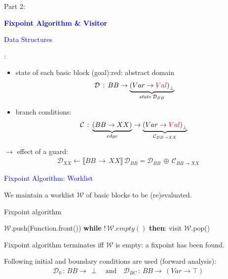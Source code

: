 \begin{frame}

Part 2:
\vspace{0.2cm}

{\LARGE \textbf{\textcolor{blue}{Fixpoint Algorithm \& Visitor}}}

\end{frame}


\begin{frame}[fragile]{\textcolor{blue}{Data Structures}}

\underline{}:
\begin{itemize}
\item {\color{blue}state} of each basic block (goal):\hfill {\color{red}red: abstract domain}
\begin{align*}
\mathcal{D}\,:\, BB\rightarrow \underbrace{ \left( Var \rightarrow {\color{red}Val} \right)_{\perp} }_{state\,\mathcal{D}_{BB}}
\end{align*}
\item {\color{blue}branch conditions}:
\begin{align*}
\mathcal{C}\,:\, \underbrace{\left(BB\rightarrow XX\right)}_{edge} \rightarrow \underbrace{ \left( Var \rightarrow {\color{red}Val} \right)_{\perp} }_{\mathcal{C}_{BB\rightarrow XX}}
\end{align*}
\end{itemize}
\qquad$\rightarrow$ effect of a guard: \begin{align*}
\mathcal{D}_{XX} \gets \llbracket BB\,\rightarrow\,XX \rrbracket \, \mathcal{D}_{BB} = \mathcal{D}_{BB} \,\oplus\, \mathcal{C}_{BB\rightarrow XX}
\end{align*}
\end{frame}

\begin{frame}[fragile]{\textcolor{blue}{Fixpoint Algorithm: Worklist}}

We maintain a {\color{blue}worklist $\mathcal{W}$} of basic blocks to be (re)evaluated.

\begin{algorithm}[H]
\caption{Fixpoint algorithm}
\begin{algorithmic}[1]
\State $\mathcal{W}$.push(Function.front())
\State \textbf{while} $!\, \mathcal{W}.empty()$ \textbf{then}:
\State \qquad visit $\mathcal{W}$.pop()
\EndProcedure
\end{algorithmic}
\end{algorithm}

Fixpoint algorithm terminates iff $\mathcal{W}$ is empty: a fixpoint has been found.

\vfill

Following {\color{blue}initial and boundary conditions} are used (forward analysis):
\begin{align*}
\mathcal{D}_0\,:\, BB\rightarrow \, \perp \quad \text{and}\quad
\mathcal{D}_{BC}\,:\, BB\rightarrow \, \left( Var\rightarrow \top \right)
\end{align*}

\end{frame}



